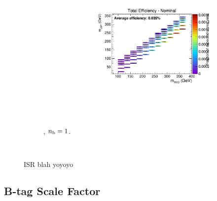 \begin{figure}[ht!]
\begin{subfigure}[b]{0.32\textwidth}
    \includegraphics[width=\textwidth, page=6]{Figs/sms/t2cc/v24/ISR_T2cc_v24_eq1b_ge4j_incl.pdf}
    \caption{\njhigh, $n_{\text{b}} = 1$.}
  \end{subfigure}\\
  \caption{ISR blah yoyoyo}
  \label{fig:sms-isr-t2cc}
\end{figure}


\newpage
\subsection*{B-tag Scale Factor}

